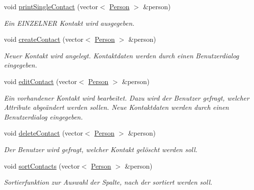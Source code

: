 \begin{DoxyCompactItemize}
void \hyperlink{classContactManager_1_1Controller_ad56146eba96b0f1c4f535e978d75a0f2}{print\+Single\+Contact} (vector$<$ \hyperlink{classContactManager_1_1Person}{Person} $>$ \&person)
\begin{DoxyCompactList}\small\item\em Ein E\+I\+N\+Z\+E\+L\+N\+ER Kontakt wird ausgegeben.\end{DoxyCompactList}\item 
void \hyperlink{classContactManager_1_1Controller_a6f5ce489625a26dc82f3473b63cc4336}{create\+Contact} (vector$<$ \hyperlink{classContactManager_1_1Person}{Person} $>$ \&person)
\begin{DoxyCompactList}\small\item\em Neuer Kontakt wird angelegt. Kontaktdaten werden durch einen Benutzerdialog eingegeben.\end{DoxyCompactList}\item 
void \hyperlink{classContactManager_1_1Controller_a53c3a1c796234dfd8ba4778c2a0621f2}{edit\+Contact} (vector$<$ \hyperlink{classContactManager_1_1Person}{Person} $>$ \&person)
\begin{DoxyCompactList}\small\item\em Ein vorhandener Kontakt wird bearbeitet. Dazu wird der Benutzer gefragt, welcher Attribute abgeändert werden sollen. Neue Kontaktdaten werden durch einen Benutzerdialog eingegeben.\end{DoxyCompactList}\item 
void \hyperlink{classContactManager_1_1Controller_a87af8bc174a36e01cedb9a892a6b6aa0}{delete\+Contact} (vector$<$ \hyperlink{classContactManager_1_1Person}{Person} $>$ \&person)
\begin{DoxyCompactList}\small\item\em Der Benutzer wird gefragt, welcher Kontakt gelöscht werden soll.\end{DoxyCompactList}\item 
void \hyperlink{classContactManager_1_1Controller_af3f6d4b019d84eda7cd83447158cb61c}{sort\+Contacts} (vector$<$ \hyperlink{classContactManager_1_1Person}{Person} $>$ \&person)
\begin{DoxyCompactList}\small\item\em Sortierfunktion zur Auswahl der Spalte, nach der sortiert werden soll.\end{DoxyCompactList}\item 
\mbox{\label{classContactManager_1_1Controller_a11f502dd111efc1f181229119e52eb02}} 

\end{DoxyCompactItemize}
